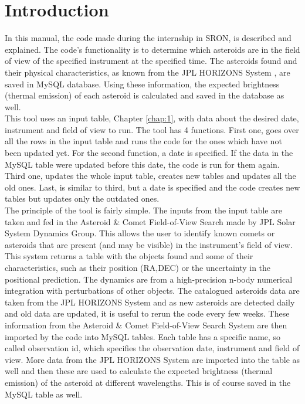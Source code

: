 \chapter{Introduction}
 
In this manual, the code made during the internship in SRON, is described and explained. The code's functionality is to determine which asteroids are in the field of view of the specified instrument at the specified time. The asteroids found and their physical characteristics, as known from the JPL HORIZONS System \cite{hor}, are saved in MySQL database. Using these information, the expected brightness (thermal emission) of each asteroid is calculated and saved in the database as well.\\

This tool uses an input table, Chapter \ref{chap:1}, with data about the desired date, instrument and field of view to run. The tool has 4 functions. First one, goes over all the rows in the input table and runs the code for the ones which have not been updated yet. For the second function, a date is specified. If the data in the MySQL table were updated before this date, the code is run for them again. Third one, updates the whole input table, creates new tables and updates all the old ones. Last, is similar to third, but a date is specified and the code creates new tables but updates only the outdated ones. \\

The principle of the tool is fairly simple. The inputs from the input table are taken and fed in the 
Asteroid \& Comet Field-of-View Search \cite{ispy} made by JPL Solar System Dynamics Group. This allows the user to identify known comets or asteroids that are present (and may be visible) in the instrument's field of view. This system returns a table with the objects found and some of their characteristics, such as their position (RA,DEC) or the uncertainty in the positional prediction. The dynamics are from a high-precision n-body numerical integration with perturbations of other objects. The catalogued asteroids data are taken from the JPL HORIZONS System \cite{hor} and as new asteroids are detected daily and old data are updated, it is useful to rerun the code every few weeks.
These information from the Asteroid \& Comet Field-of-View Search System are then imported by the code into MySQL tables. Each table has a specific name, so called observation id, which specifies the observation date, instrument and field of view. More data from the JPL HORIZONS System are imported into the table as well and then these are used to calculate the expected brightness (thermal emission) of the asteroid at different wavelengths. This is of course saved in the MySQL table as well. \\

